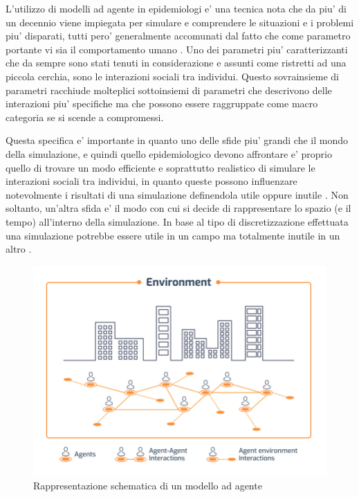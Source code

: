 L'utilizzo di modelli ad agente in epidemiologi e' una tecnica nota che 
da piu' di un decennio viene impiegata per simulare e comprendere le 
situazioni e i problemi piu' disparati, tutti pero' generalmente accomunati
dal fatto che come parametro portante vi sia il comportamento umano \cite{Groff2019}
\cite{El-Sayed2012-ac} \cite{Tracy2018-lc} \cite{Bissett2021}. 
Uno dei parametri piu' caratterizzanti che da sempre sono stati tenuti 
in considerazione e assunti come ristretti ad una piccola cerchia, sono 
le interazioni sociali tra individui. Questo sovrainsieme di parametri 
racchiude molteplici sottoinsiemi di parametri che descrivono delle 
interazioni piu' specifiche ma che possono essere raggruppate come macro 
categoria se si scende a compromessi. 

Questa specifica e' importante in quanto uno delle sfide piu' grandi che 
il mondo della simulazione, e quindi quello epidemiologico devono affrontare
e' proprio quello di trovare un modo efficiente e soprattutto realistico 
di simulare le interazioni sociali tra individui, in quanto queste possono
influenzare notevolmente i risultati di una simulazione definendola utile
oppure inutile \cite{Silverman2021}. Non soltanto, un'altra sfida e' il modo 
con cui si decide di rappresentare lo spazio (e il tempo) all'interno della
simulazione. In base al tipo di discretizzazione effettuata una simulazione
potrebbe essere utile in un campo ma totalmente inutile in un altro 
\cite{KONSTANTINOUDIS2020100319}.

\begin{figure}[h]
    \begin{center}
        \includegraphics[width=\linewidth]{img/Schematic-representation-of-an-agent-based-model-ABM.png}
        \caption{Rappresentazione schematica di un modello ad agente}
        \label{fig:schematic_representation_abm}
    \end{center}
\end{figure}


